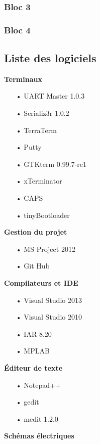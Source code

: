 \documentclass[10pt,a4paper,final]{article}
\begin{document}
\begin{spacing}{1.5}
\subsubsection{Bloc 3}

\subsubsection{Bloc 4}

\subsection{Liste des logiciels}
\begin{flushleft}
\HRule
\end{flushleft}
\begin{flushleft}

\begin{multicols}{3}

\textbf{Terminaux}
\begin{itemize}
\item[•]UART Master 1.0.3
\item[•]Serializ3r 1.0.2
\item[•]TerraTerm
\item[•]Putty
\item[•]GTKterm 0.99.7-rc1
\item[•]xTerminator
\item[•]CAPS
\item[•]tinyBootloader
\end{itemize}

\textbf{Gestion du projet}
\begin{itemize}
\item[•]MS Project 2012
\item[•]Git Hub
\end{itemize}

\textbf{Compilateurs et IDE}
\begin{itemize}
\item[•]Visual Studio 2013
\item[•]Visual Studio 2010
\item[•]IAR 8.20
\item[•]MPLAB
\end{itemize}

\textbf{Éditeur de texte}
\begin{itemize}
\item[•]Notepad++
\item[•]gedit
\item[•]medit 1.2.0
\end{itemize}
\textbf{Schémas électriques}


\end{multicols}
\end{flushleft}
\end{spacing}
\end{document}
